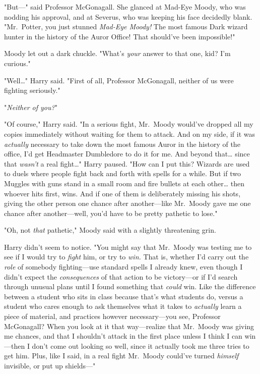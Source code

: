 "But---" said Professor McGonagall. She glanced at Mad-Eye Moody, who was 
nodding his approval, and at Severus, who was keeping his face decidedly blank. 
"Mr.~Potter, you just stunned \emph{Mad-Eye Moody!}  The most famous Dark 
wizard hunter in the history of the Auror Office! That should've been 
impossible!"

Moody let out a dark chuckle. "What's \emph{your} answer to that one, kid? I'm 
curious."

"Well{\ldots}" Harry said. "First of all, Professor McGonagall, neither of us 
were fighting seriously."

"\emph{Neither of you?}"

"Of course," Harry said. "In a serious fight, Mr.~Moody would've dropped all my 
copies immediately without waiting for them to attack. And on my side, if it 
was \emph{actually} necessary to take down the most famous Auror in the history 
of the office, I'd get Headmaster Dumbledore to do it for me. And beyond 
that{\ldots} since that \emph{wasn't} a real fight{\ldots}" Harry paused. "How 
can I put this? Wizards are used to duels where people fight back and forth 
with spells for a while. But if two Muggles with guns stand in a small room and 
fire bullets at each other{\ldots} then whoever hits first, wins. And if one of 
them is deliberately missing his shots, giving the other person one chance 
after another---like Mr.~Moody gave me one chance after another---well, you'd 
have to be pretty pathetic to lose."

"Oh, not \emph{that} pathetic," Moody said with a slightly threatening grin.

Harry didn't seem to notice. "You might say that Mr.~Moody was testing me to 
see if I would try to \emph{fight} him, or try to \emph{win.} That is, whether 
I'd carry out the \emph{role} of somebody fighting---use standard spells I 
already knew, even though I didn't expect the \emph{consequences} of that 
action to be victory---or if I'd search through unusual plans until I found 
something that \emph{could} win. Like the difference between a student who sits 
in class because that's what students do, versus a student who cares enough to 
ask themselves what it takes to \emph{actually} learn a piece of material, and 
practices however necessary---you see, Professor McGonagall? When you look at 
it that way---realize that Mr.~Moody was giving me chances, and that I 
shouldn't attack in the first place unless I think I can win---then I don't 
come out looking so well, since it actually took me three tries to get him. 
Plus, like I said, in a real fight Mr.~Moody could've turned \emph{himself} 
invisible, or put up shields---"

